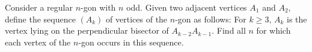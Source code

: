 Consider a regular $n$-gon with $n$ odd. Given two adjacent vertices $A_{1}$ and $A_{2},$ define the sequence $(A_{k})$ of vertices of the $n$-gon as follows: For $k\ge 3,\, A_{k}$ is the vertex lying on the perpendicular bisector of $A_{k-2}A_{k-1}.$ Find all $n$ for which each vertex of the $n$-gon occurs in this sequence.